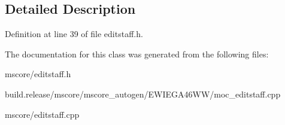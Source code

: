 \subsection{Detailed Description}


Definition at line 39 of file editstaff.\+h.



The documentation for this class was generated from the following files\+:\begin{DoxyCompactItemize}
\item 
mscore/editstaff.\+h\item 
build.\+release/mscore/mscore\+\_\+autogen/\+E\+W\+I\+E\+G\+A46\+W\+W/moc\+\_\+editstaff.\+cpp\item 
mscore/editstaff.\+cpp\end{DoxyCompactItemize}
